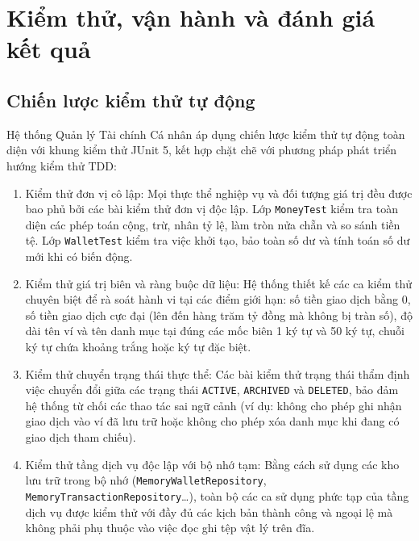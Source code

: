 \documentclass[a4paper,12pt]{report}
\newcommand{\passthrough}[1]{#1}
\begin{document}
\chapter{Kiểm thử, vận hành và đánh giá kết
quả}\label{kiux1ec3m-thux1eed-vux1eadn-huxe0nh-vuxe0-ux111uxe1nh-giuxe1-kux1ebft-quux1ea3}

\section{Chiến lược kiểm thử tự
động}\label{chiux1ebfn-lux1b0ux1ee3c-kiux1ec3m-thux1eed-tux1ef1-ux111ux1ed9ng}

Hệ thống Quản lý Tài chính Cá nhân áp dụng chiến lược kiểm thử tự động
toàn diện với khung kiểm thử JUnit 5, kết hợp chặt chẽ với phương pháp
phát triển hướng kiểm thử TDD:

\begin{enumerate}
\def\labelenumi{\arabic{enumi}.}
\item
  Kiểm thử đơn vị cô lập: Mọi thực thể nghiệp vụ và đối tượng giá trị
  đều được bao phủ bởi các bài kiểm thử đơn vị độc lập. Lớp
  \passthrough{\lstinline!MoneyTest!} kiểm tra toàn diện các phép toán
  cộng, trừ, nhân tỷ lệ, làm tròn nửa chẵn và so sánh tiền tệ. Lớp
  \passthrough{\lstinline!WalletTest!} kiểm tra việc khởi tạo, bảo toàn
  số dư và tính toán số dư mới khi có biến động.
\item
  Kiểm thử giá trị biên và ràng buộc dữ liệu: Hệ thống thiết kế các ca
  kiểm thử chuyên biệt để rà soát hành vi tại các điểm giới hạn: số tiền
  giao dịch bằng 0, số tiền giao dịch cực đại (lên đến hàng trăm tỷ đồng
  mà không bị tràn số), độ dài tên ví và tên danh mục tại đúng các mốc
  biên 1 ký tự và 50 ký tự, chuỗi ký tự chứa khoảng trắng hoặc ký tự đặc
  biệt.
\item
  Kiểm thử chuyển trạng thái thực thể: Các bài kiểm thử trạng thái thẩm
  định việc chuyển đổi giữa các trạng thái
  \passthrough{\lstinline!ACTIVE!}, \passthrough{\lstinline!ARCHIVED!}
  và \passthrough{\lstinline!DELETED!}, bảo đảm hệ thống từ chối các
  thao tác sai ngữ cảnh (ví dụ: không cho phép ghi nhận giao dịch vào ví
  đã lưu trữ hoặc không cho phép xóa danh mục khi đang có giao dịch tham
  chiếu).
\item
  Kiểm thử tầng dịch vụ độc lập với bộ nhớ tạm: Bằng cách sử dụng các
  kho lưu trữ trong bộ nhớ
  (\passthrough{\lstinline!MemoryWalletRepository!},
  \passthrough{\lstinline!MemoryTransactionRepository!}\ldots), toàn bộ
  các ca sử dụng phức tạp của tầng dịch vụ được kiểm thử với đầy đủ các
  kịch bản thành công và ngoại lệ mà không phải phụ thuộc vào việc đọc
  ghi tệp vật lý trên đĩa.
\end{enumerate}
\end{document}
